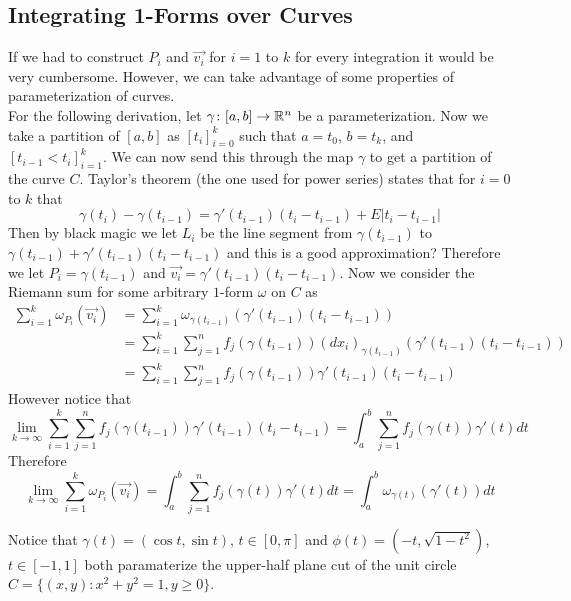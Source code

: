 \documentclass[notes.tex]{subfiles}
\begin{document}
\subsection{Integrating 1-Forms over Curves}
If we had to construct $P_i$ and $\vec{v_i}$ for $i = 1$ to $k$ for every integration it would be very cumbersome. However, we can take advantage of some properties of parameterization of curves. \\
For the following derivation, let $\gamma\colon[a, b] \to \mathbb{R}^n$ be a parameterization. Now we take a partition of $[a, b]$ as $[t_i]_{i = 0}^k$ such that $a = t_0$, $b = t_k$, and $[t_{i - 1} < t_i]_{i = 1}^k$. We can now send this through the map $\gamma$ to get a partition of the curve $C$. Taylor's theorem (the one used for power series) states that for $i = 0$ to $k$ that
\[
    \gamma(t_i) - \gamma(t_{i - 1}) = \gamma'(t_{i - 1})(t_i - t_{i -1}) + E|t_i - t_{i - 1}|
\]
Then by black magic we let $L_i$ be the line segment from $\gamma(t_{i - 1})$ to $\gamma(t_{i - 1}) + \gamma'(t_{i - 1})(t_i - t_{i - 1})$ and this is a good approximation? Therefore we let $P_i = \gamma(t_{i - 1})$ and $\vec{v_i} = \gamma'(t_{i - 1})(t_i - t_{i - 1})$. Now we consider the Riemann sum for some arbitrary $1$-form $\omega$ on $C$ as
\begin{align*}
    \sum_{i = 1}^k \omega_{P_i}(\vec{v_i})
    &= \sum_{i = 1}^k \omega_{\gamma(t_{i - 1})}(\gamma'(t_{i - 1})(t_i - t_{i - 1})) \\
    &= \sum_{i = 1}^k \sum_{j = 1}^n f_j(\gamma(t_{i - 1}))(dx_i)_{\gamma(t_{i - 1})}(\gamma'(t_{i - 1})(t_i - t_{i - 1})) \\
    &= \sum_{i = 1}^k \sum_{j = 1}^n f_j(\gamma(t_{i - 1}))\gamma'(t_{i - 1})(t_i - t_{i - 1})
\end{align*}
However notice that
\[
    \lim_{k\to\infty} \sum_{i = 1}^k \sum_{j = 1}^n f_j(\gamma(t_{i - 1}))\gamma'(t_{i - 1})(t_i - t_{i - 1}) = \int_a^b \sum_{j = 1}^n f_j(\gamma(t))\gamma'(t)dt
\]
Therefore
\[
    \lim_{k\to\infty} \sum_{i = 1}^k \omega_{P_i}(\vec{v_i}) = \int_a^b \sum_{j = 1}^n f_j(\gamma(t))\gamma'(t)dt = \int_a^b \omega_{\gamma(t)}(\gamma'(t))dt
\]

Notice that $\gamma(t) = (\cos t, \sin t)$, $t \in [0, \pi]$ and $\phi(t) = (-t, \sqrt{1 - t^2})$, $t \in [-1, 1]$ both paramaterize the upper-half plane cut of the unit circle $C = \{ (x, y) : x^2 + y^2 = 1, y \geq 0 \}$.
\end{document}
